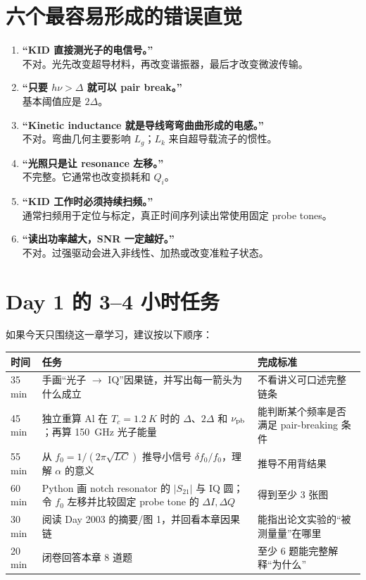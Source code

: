 \documentclass[11pt,a4paper,openany]{ctexrep}
\begin{document}
\section{六个最容易形成的错误直觉}
\begin{enumerate}
  \item \textbf{“KID 直接测光子的电信号。”}\\
  不对。光先改变超导材料，再改变谐振器，最后才改变微波传输。
  \item \textbf{“只要 $h\nu>\Delta$ 就可以 pair break。”}\\
  基本阈值应是 $2\Delta$。
  \item \textbf{“Kinetic inductance 就是导线弯弯曲曲形成的电感。”}\\
  不对。弯曲几何主要影响 $L_g$；$L_k$ 来自超导载流子的惯性。
  \item \textbf{“光照只是让 resonance 左移。”}\\
  不完整。它通常也改变损耗和 $Q_i$。
  \item \textbf{“KID 工作时必须持续扫频。”}\\
  通常扫频用于定位与标定，真正时间序列读出常使用固定 probe tones。
  \item \textbf{“读出功率越大，SNR 一定越好。”}\\
  不对。过强驱动会进入非线性、加热或改变准粒子状态。
\end{enumerate}

\section{Day 1 的 3--4 小时任务}
如果今天只围绕这一章学习，建议按以下顺序：

\begin{tabularx}{\textwidth}{p{1.8cm} X X}
\toprule
时间 & 任务 & 完成标准 \\
\midrule
35 min & 手画“光子 $\rightarrow$ IQ”因果链，并写出每一箭头为什么成立 & 不看讲义可口述完整链条 \\
45 min & 独立重算 Al 在 $T_c=\SI{1.2}{K}$ 时的 $\Delta$、$2\Delta$ 和 $\nu_{\rm pb}$；再算 \SI{150}{GHz} 光子能量 & 能判断某个频率是否满足 pair-breaking 条件 \\
55 min & 从 $f_0=1/(2\pi\sqrt{LC})$ 推导小信号 $\delta f_0/f_0$，理解 $\alpha$ 的意义 & 推导不用背结果 \\
60 min & Python 画 notch resonator 的 $|S_{21}|$ 与 IQ 圆；令 $f_0$ 左移并比较固定 probe tone 的 $\Delta I,\Delta Q$ & 得到至少 3 张图 \\
30 min & 阅读 Day 2003 的摘要/图 1，并回看本章因果链 & 能指出论文实验的“被测量量”在哪里 \\
20 min & 闭卷回答本章 8 道题 & 至少 6 题能完整解释“为什么” \\
\bottomrule
\end{tabularx}
\end{document}
